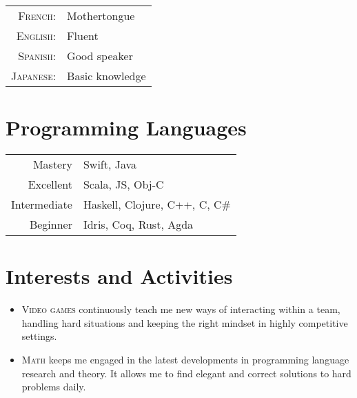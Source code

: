 \documentclass[a4paper,10pt]{article} %
\begin{document}
\begin{tabular}{rl}
\textsc{French:} & Mothertongue\\

\textsc{English:} & Fluent\\

\textsc{Spanish:} & Good speaker\\

\textsc{Japanese:} & Basic knowledge\\

\end{tabular}


\section{Programming Languages}

\begin{tabular}{r|l}
Mastery & Swift, Java\\
Excellent & Scala, JS, Obj-C\\
Intermediate & Haskell, Clojure, C++, C, C\#\\
Beginner & Idris, Coq, Rust, Agda\\
\end{tabular}

\section{Interests and Activities}
\begin{itemize}
	\item \textsc{Video games} continuously teach me new ways of interacting within a team, handling hard situations and keeping the right mindset in highly competitive settings.
	\item \textsc{Math} keeps me engaged in the latest developments in programming language research and theory. It allows me to find elegant and correct solutions to hard problems daily.
\end{itemize}
\end{document}
